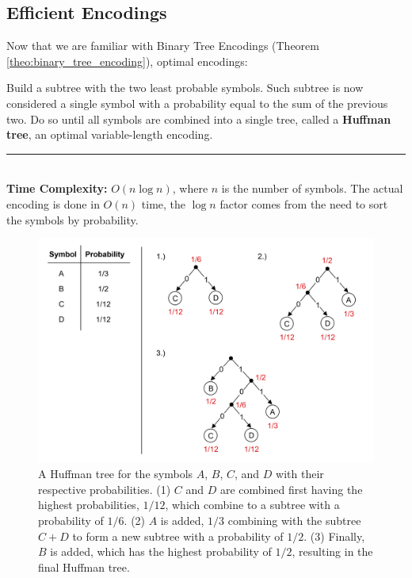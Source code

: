 \subsection{Efficient Encodings}

\label{sec:info_effic}

Now that we are familiar with Binary Tree Encodings (Theorem \ref{theo:binary_tree_encoding}), optimal encodings:
\begin{Def}

    \noindent
    Build a subtree with the two least probable symbols. Such subtree is now 
    considered a single symbol with a probability equal to the sum of the previous two.
    Do so until all symbols are combined into a single tree, called a \textbf{Huffman tree}, an 
    optimal variable-length encoding.

\noindent
\rule{\textwidth}{0.4pt}\\
\textbf{Time Complexity:} $O(n \log n)$, where $n$ is the number of symbols. The actual
encoding is done in $O(n)$ time, the $\log n$ factor comes from the need to sort the symbols by probability.
\end{Def}

\begin{figure}[ht!]
    \centering
    \includegraphics[width=\textwidth]{./Sections/comp/info_effic/huffman_tree.png}
    \caption{A Huffman tree for the symbols $A$, $B$, $C$, and $D$ with their respective probabilities.
    (1) $C$ and $D$ are combined first having the highest probabilities, $1/12$, which combine to a subtree with a probability of $1/6$.
    (2) $A$ is added, $1/3$ combining with the subtree $C+D$ to form a new subtree with a probability of $1/2$.
    (3) Finally, $B$ is added, which has the highest probability of $1/2$, resulting in the final Huffman tree.}
    \label{fig:huffman_tree}
\end{figure}

